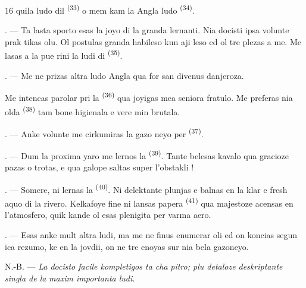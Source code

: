 \begin{VUpage}[18]{16}
\VUcontinue
quila ludo dil \textsuperscript{(33)} o mem kam la Angla\nl
ludo \textsuperscript{(34)}.

. --- Ta lasta sporto esas la joyo di la\nl
granda lernanti. Nia docisti ipsa volunte prak\cc
tikas olu. Ol postulas granda habileso kun aji\cc
leso ed ol tre plezas a me. Me lasas a la pue\cc
rini la ludi di \textsuperscript{(35)}.

. --- Me ne prizas altra ludo Angla qua for\cc
san divenus danjeroza.

\VUblancAlinea
Me intencas parolar pri la \textsuperscript{(36)}\nl
qua joyigas mea seniora fratulo. Me preferas\nl
nia olda \textsuperscript{(38)} tam bone higienala e\nl
vere min brutala.

\VUsaut{4.6mm}
\VUsaut{3.0mm}

. --- Anke volunte me cirkumiras la gazo\cc
neyo per \textsuperscript{(37)}.

. --- Dum la proxima yaro me lernos la\nl
{}\textsuperscript{(39)}. Tante belesas kavalo qua gracioze\nl
pazas o trotas, e qua galope saltas super\nl
l'obstakli !

. --- Somere, ni lernas la \textsuperscript{(40)}. Ni\nl
delektante plunjas e balnas en la klar e fresh\nl
aquo di la rivero. Kelkafoye fine ni lansas\nl
papera \textsuperscript{(41)} qua majestoze acensas en\nl
l'atmosfero, quik kande ol esas plenigita per\nl
varma aero.

. --- Esas anke mult altra ludi, ma me ne\nl
finus enumerar oli ed on koncias segun ica\nl
rezumo, ke en la jovdii, on ne tre enoyas sur\nl
nia bela gazoneyo.

\VUblancAlinea
N.-B. --- \textit{La docisto facile kompletigos ta cha}\cc
\textit{pitro; plu detaloze deskriptante singla de la}\nl
\textit{maxim importanta ludi.}
\end{VUpage}
